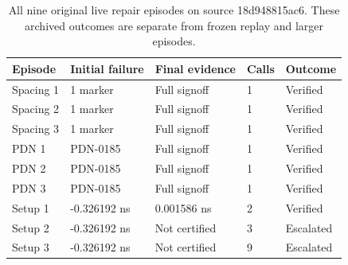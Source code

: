 \begin{table}[htbp]\centering\small\setlength{\tabcolsep}{4pt}
\caption{All nine original live repair episodes on source 18d948815ac6. These archived outcomes are separate from frozen replay and larger episodes.}\label{tab:episodes}
\begin{tabular}{@{}lllll@{}}\toprule
Episode & Initial failure & Final evidence & Calls & Outcome \\
\midrule
Spacing 1 & 1 marker & Full signoff & 1 & Verified \\
Spacing 2 & 1 marker & Full signoff & 1 & Verified \\
Spacing 3 & 1 marker & Full signoff & 1 & Verified \\
PDN 1 & PDN-0185 & Full signoff & 1 & Verified \\
PDN 2 & PDN-0185 & Full signoff & 1 & Verified \\
PDN 3 & PDN-0185 & Full signoff & 1 & Verified \\
Setup 1 & -0.326192 ns & 0.001586 ns & 2 & Verified \\
Setup 2 & -0.326192 ns & Not certified & 3 & Escalated \\
Setup 3 & -0.326192 ns & Not certified & 9 & Escalated \\
\bottomrule\end{tabular}\end{table}
